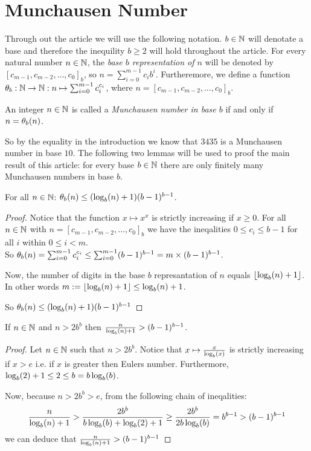 \section*{Munchausen Number}
Through out the article we will use the following notation. $b \in \N$ will 
denotate a base and therefore the inequility $b \ge 2$ will hold throughout the
article. For every natural number $n \in \N$, the \emph{base $b$ representation
of $n$} will be denoted by $[c_{m-1}, c_{m-2}, \ldots, c_{0}]_{b}$, 
so $n = \sum_{i=0}^{m-1} c_{i}b^{i}$.
Furtheremore, we define a function $\P_{b} : \N \rightarrow \N : n \mapsto 
\sum_{i=0}^{m-1} c_{i}^{c_{i}}$, where $n = [c_{m-1},c_{m-2},\ldots,c_{0}]_{b}$.

\begin{definition}
	An integer $n \in \N$ is called a \emph{Munchausen number in base $b$} if 
	and only if $n = \P_{b}(n)$.
\end{definition}

So by the equality in the introduction we know that $3435$ is a Munchausen
number in base $10$. The following two lemmas will be used to proof the main 
result of this article: for every base $b \in \N$ there are only finitely many 
Munchausen numbers in base $b$.

\begin{lemma}
	For all $n \in \N$: $\P_{b}(n) \le (\blog(n) + 1)(b-1)^{b-1}$.
\end{lemma}

\begin{proof}
	Notice that the function $x \mapsto x^{x}$ is strictly increasing if 
	$x \ge 0$. For all $n \in \N$ with 
	$n = [c_{m-1}, c_{m-2}, \ldots, c_{0}]_{b}$ we have the ineqalities 
	$0 \le c_{i} \le b-1$ for all $i$ within $0 \le i < m$.	\\
	So $\P_{b}(n) = \sum_{i=0}^{m-1} c_{i}^{c_{i}} \le 
	\sum_{i=0}^{m-1} (b-1)^{b-1} = m \times (b-1)^{b-1}$.
	
	Now, the number of digits in the base $b$ represantation of $n$ equals 
	$\floor{\blog(n) + 1}$. In other words $m := \floor{\blog(n) + 1} 
	\le \blog(n) + 1$.
	
	So $\P_{b}(n) \le (\blog(n) + 1)(b-1)^{b-1}$
\end{proof}

\begin{lemma}
	If $n \in \N$ and $n > 2b^{b}$ then $\frac{n}{\blog(n) + 1}	> (b-1)^{b-1}$.
\end{lemma}

\begin{proof}
	Let $n \in \N$ such that $n > 2b^{b}$. Notice that 
	$x \mapsto \frac{x}{\blog(x)}$ is strictly increasing if $x > e$ i.e. if $x$
	is greater then Eulers number. Furthermore, $\blog(2) + 1 \le 2 \le b = 
	b\blog(b)$. 
	
	Now, because $n > 2b^{b} > e$, from the following chain of ineqalities:
	\[
		\frac{n}{\blog(n) + 1} > \frac{2b^{b}}{b\blog(b) + \blog(2) + 1} \ge 
		\frac{2b^{b}}{2b\blog(b)} = b^{b-1} > (b-1)^{b-1}
	\]
	we can deduce that $\frac{n}{\blog(n) + 1} > (b-1)^{b-1}$
\end{proof}

